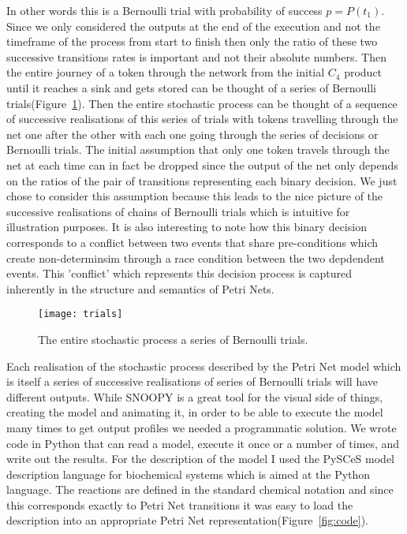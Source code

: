 In other words this is a Bernoulli trial with probability of success
$p = P(t_1)$. Since we only considered the outputs at the end of the
execution and not the timeframe of the process from start to finish
then only the ratio of these two successive transitions rates is
important and not their absolute numbers. Then the entire journey of a token through the network
from the initial $C_4$ product until it reaches a sink and gets stored
can be thought of a series of Bernoulli
trials(Figure~\ref{fig:trials}). Then the entire stochastic process
can be thought of a sequence of successive realisations of this series
of trials with tokens travelling through the net one
after the other with each one going through the series of decisions
or Bernoulli trials. The initial assumption that only one token
travels through the net at each time can in fact be dropped since the
output of the net only depends on the ratios of the pair of
transitions representing each binary decision. We just chose to
consider this assumption
because this leads to the nice picture of the successive realisations
of chains of Bernoulli trials which is intuitive for illustration
purposes.
It is also interesting to note how this binary decision
corresponds to a conflict between two events that share pre-conditions
which create non-determinsim through a race condition between the two
depdendent events. This 'conflict' which represents this decision
process is captured inherently in the structure and semantics of Petri
Nets.

\begin{figure}[htbp!]
\centering
\texttt{[image: trials]}
\caption[Stochastic proces as a series of Bernoulli trials]{The entire
stochastic process a series of Bernoulli trials.}
\label{fig:trials}
\end{figure}

Each realisation of the stochastic process described by the Petri Net
model which is itself a series of successive realisations of series of
Bernoulli trials will have different outputs. While SNOOPY is a great
tool for the visual side of things, creating the model and animating
it, in order to be able to execute the model many times to get
output profiles we needed a programmatic solution. We wrote code in
Python that can read a model, execute it once or a number of times, and write
out the results. For the description of the model I used the PySCeS
model description language for biochemical systems which is aimed at
the Python language. The reactions are
defined in the standard chemical notation and since this corresponds
exactly to Petri Net transitions it was easy to load the description
into an appropriate Petri Net representation(Figure~\ref{fig:code}).

